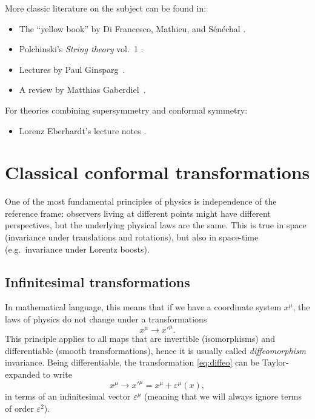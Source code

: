 \documentclass[a4paper,12pt]{article}
\numberwithin{equation}{section}
\begin{document}
More classic literature on the subject can be found in:
\begin{itemize}

\item
The ``yellow book'' by Di Francesco, Mathieu, and Sénéchal
\cite{DiFrancesco:1997nk}.

\item
Polchinski's \emph{String theory} vol.~1
\cite{Polchinski:1998rq}.

\item
Lectures by Paul Ginsparg~\cite{Ginsparg:1988ui}.

\item
A review by Matthias Gaberdiel~\cite{Gaberdiel:1999mc}.

\end{itemize}
%
For theories combining supersymmetry and conformal symmetry:
\begin{itemize}

\item
Lorenz Eberhardt's lecture notes 
\cite{Eberhardt:2020cxo}.

\end{itemize}


\section{Classical conformal transformations}
\label{sec:classical}

One of the most fundamental principles of physics is independence of the reference frame: observers living at different points might have different perspectives, but the underlying physical laws are the same.
This is true in space (invariance under translations and rotations), but also in space-time (e.g.~invariance under Lorentz boosts).

\subsection{Infinitesimal transformations}

In mathematical language, this means that if we have a coordinate system $x^\mu$, the laws of physics do not change under a transformations 
\begin{equation}
	x^\mu \to x'^\mu.
	\label{eq:diffeo}
\end{equation}
This principle applies to all maps that are invertible (isomorphisms) and differentiable (smooth transformations), hence it is usually called \emph{diffeomorphism} invariance.
Being differentiable, the transformation \eqref{eq:diffeo} can be Taylor-expanded to write
\begin{equation}
	x^\mu \to x'^\mu = x^\mu + \varepsilon^\mu(x),
	\label{eq:diffeo:infinitesimal}
\end{equation}
in terms of an infinitesimal vector $\varepsilon^\mu$ (meaning that we will always ignore terms of order $\varepsilon^2$).
\end{document}
